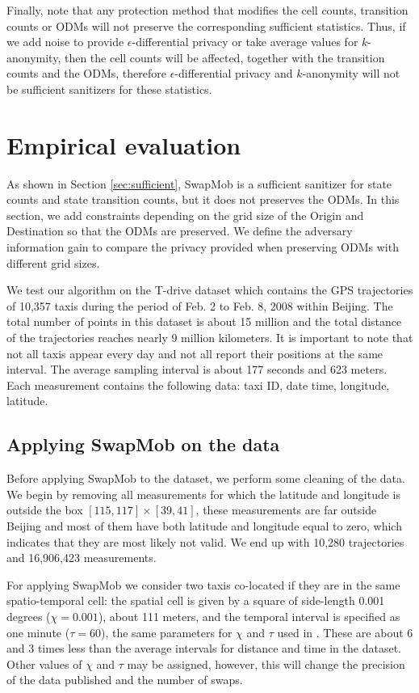 \documentclass[times,twocolumn,final,authoryear]{elsarticle}
\begin{document}
{\color{blue}
Finally, note that any protection method that modifies the cell counts, transition counts or ODMs will not preserve the corresponding sufficient statistics. Thus, if we add noise to provide $\epsilon$-differential privacy or take average values for $k$-anonymity, then the cell counts will be affected, together with the transition counts and the ODMs, therefore $\epsilon$-differential privacy and $k$-anonymity will not be sufficient sanitizers for these statistics.
}

\section{Empirical evaluation}\label{Sec:evaluation}
{\color{blue}
As shown in Section \ref{sec:sufficient}, SwapMob is a sufficient sanitizer for state counts and state transition counts, but it does not preserves the ODMs.
In this section, we add constraints depending on the grid size of the Origin and Destination so that the ODMs are preserved. 
We define the adversary information gain to compare the privacy provided when preserving ODMs with different grid sizes.
}

We test our algorithm on the T-drive dataset
\citep{Yuan2010,Yuan2011} which contains the GPS trajectories of
10,357 taxis during the period of Feb. 2 to Feb. 8, 2008 within
Beijing. The total number of points in this dataset is about 15
million and the total distance of the trajectories reaches nearly 9
million kilometers. It is important to note that not all taxis appear
every day and not all report their positions at the same interval. The
average sampling interval is about 177 seconds and 623 meters. Each
measurement contains the following data: taxi ID, date time,
longitude, latitude.

\subsection{Applying SwapMob on the data}
Before applying SwapMob to the dataset, we perform some cleaning of the
data. We begin by removing all measurements for which the latitude and
longitude is outside the box $[115, 117] \times [39, 41]$, these
measurements are far outside Beijing and most of them have both
latitude and longitude equal to zero, which indicates that they
are most likely not valid. We end up with 10,280 trajectories and 16,906,423
measurements.

For applying SwapMob we consider two taxis co-located if they are in
the same spatio-temporal cell: the spatial cell is given by a square of side-length 0.001 degrees ($\chi = 0.001$), about 111
meters, and the temporal interval is specified as one minute ($\tau = 60$), 
{\color{blue} the same parameters for $\chi$ and $\tau$ used in \cite{Salas:2018-c}.
These are about 6 and 3 times less than the average intervals for distance and time in the dataset.
Other values of $\chi$ and $\tau$ may be assigned, however, this will change the precision of the data published and the number of swaps.}
\end{document}
